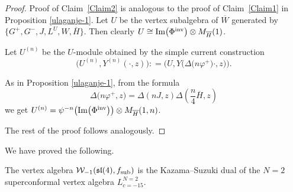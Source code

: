 \begin{proof}
Proof of Claim~\ref{Claim2} is analogous to the proof of Claim~\ref{Claim1} in Proposition \ref{ulaganje-1}. Let $U$ be the vertex subalgebra of $\overline W$ generated by $\big\{ G^+, G^-, J, L^U, W, \overline{H} \big\}$. Then clearly $U \cong \operatorname{Im} \bigl(\Phi^{\rm inv}\bigr) \otimes M_{\overline{H}} (1)$.

Let $ U^{(n)} $ be the $U$-module obtained by the simple current construction
\[ \bigl(U^{(n)}, Y^{(n)} (\cdot, z)\bigr): = \bigl(U , Y\bigl(\Delta\bigl(n \varphi^+\bigr) \cdot, z\bigr)\bigr).
\]

As in Proposition \ref{ulaganje-1}, from the formula
\[%
\Delta\bigl(n\varphi^+, z\bigr) = \Delta( nJ, z) \Delta\left(\frac{n}{4} \overline{H}, z\right)
\]
we get
$U^{(n)}= \psi^{-n}\bigl( \operatorname{Im} \bigl(\Phi^{\rm inv}\bigr)\bigr) \otimes M_{\overline{H}} (1,n )$.


The rest of the proof follows analogously.
\end{proof}

We have proved the following.

\begin{Theorem} The vertex algebra $\mathcal{W}_{-1}(\mathfrak{sl}(4), f_{\rm sub})$ is the Kazama--Suzuki dual of the $N=2$ superconformal vertex algebra $L^{N=2}_{c=-15}$.
\end{Theorem}
